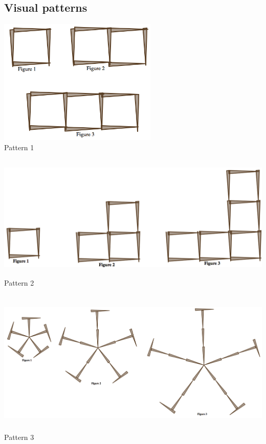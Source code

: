 \documentclass[12pt, reqno]{amsart}
\theoremstyle{remark}
\theoremstyle{definition}
\numberwithin{equation}{section}  %
\begin{document}
\bigskip
\bigskip

\subsection*{Visual patterns}

\begin{center}
\includegraphics[height=6cm]{matching1}\\
Pattern 1

\bigskip


\includegraphics[height=6cm]{matching2}\\
Pattern 2


\bigskip

\includegraphics[height=7cm]{matching3}\\
Pattern 3



\end{center}
\end{document}
